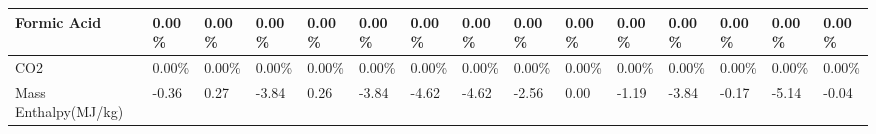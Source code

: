 \begin{landscape}
\begin{table}[H]
\begin{tabular}{|l|l|l|l|l|l|l|l|l|l|l|l|l|l|l|}
Formic Acid             & 0.00\%  & 0.00\%  & 0.00\%  & 0.00\%  & 0.00\%  & 0.00\%  & 0.00\%  & 0.00\%  & 0.00\%   & 0.00\%   & 0.00\%  & 0.00\%  & 0.00\%  & 0.00\%   \\ \hline
CO2                     & 0.00\%  & 0.00\%  & 0.00\%  & 0.00\%  & 0.00\%  & 0.00\%  & 0.00\%  & 0.00\%  & 0.00\%   & 0.00\%   & 0.00\%  & 0.00\%  & 0.00\%  & 0.00\%   \\ \hline
Mass Enthalpy(MJ/kg)    & -0.36   & 0.27    & -3.84   & 0.26    & -3.84   & -4.62   & -4.62   & -2.56   & 0.00     & -1.19    & -3.84   & -0.17   & -5.14   & -0.04    \\ \hline
\end{tabular}
\end{table}







\end{landscape}
